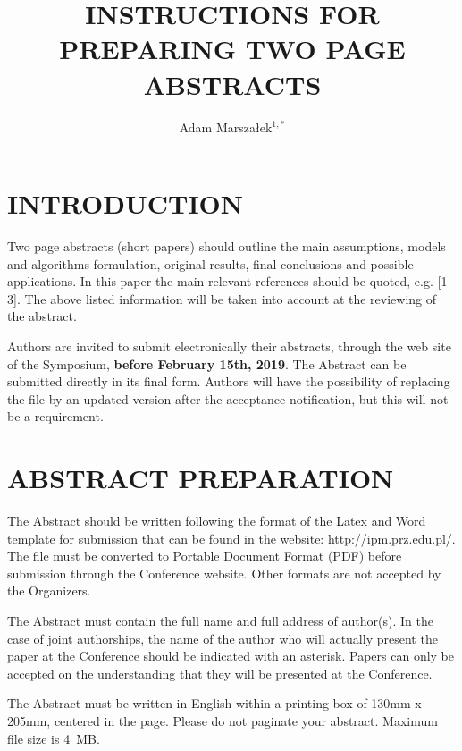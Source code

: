 \documentclass{ShortPaper_Instructions_LaTeX_IPM2019}
\title{INSTRUCTIONS FOR PREPARING TWO PAGE ABSTRACTS}
\author{Adam Marsza\l ek$^{1,\ast}$}
\begin{document}
\section{INTRODUCTION}
\noindent Two page abstracts (short papers) should outline the main assumptions, models and algorithms formulation, original results, final conclusions and possible applications. In this paper the main relevant references should be quoted, e.g. [1-3]. The above listed information will be taken into account at the reviewing of the abstract.

Authors are invited to submit electronically their abstracts, through the web site of the Symposium, \textbf{before February 15th, 2019}. The Abstract can be submitted directly in its final form. Authors will have the possibility of replacing the file by an updated version after the acceptance notification, but this will not be a requirement.

\section{ABSTRACT PREPARATION}
\noindent The Abstract should be written following the format of the Latex and Word template for submission that can be found in the website: http://ipm.prz.edu.pl/. The file must be converted to Portable Document Format (PDF) before submission through the Conference website. Other formats are not accepted by the Organizers.

The Abstract must contain the full name and full address of author(s). In the case of joint authorships, the name of the author who will actually present the paper at the Conference should be indicated with an asterisk. Papers can only be accepted on the understanding that they will be presented at the Conference.

The Abstract must be written in English within a printing box of 130mm x 205mm, centered in the page. Please do not paginate your abstract. Maximum file size is 4~MB.
\end{document}
